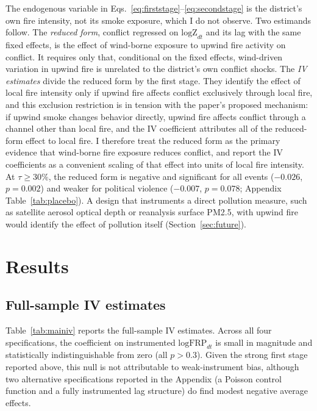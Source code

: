 \documentclass[12pt]{article}
\begin{document}
The endogenous variable in Eqs.~\eqref{eq:firststage}--\eqref{eq:secondstage} is the district's own fire intensity, not its smoke exposure, which I do not observe. Two estimands follow. The \emph{reduced form}, conflict regressed on $\text{logZ}_{dt}$ and its lag with the same fixed effects, is the effect of wind-borne exposure to upwind fire activity on conflict. It requires only that, conditional on the fixed effects, wind-driven variation in upwind fire is unrelated to the district's own conflict shocks. The \emph{IV estimates} divide the reduced form by the first stage. They identify the effect of local fire intensity only if upwind fire affects conflict exclusively through local fire, and this exclusion restriction is in tension with the paper's proposed mechanism: if upwind smoke changes behavior directly, upwind fire affects conflict through a channel other than local fire, and the IV coefficient attributes all of the reduced-form effect to local fire. I therefore treat the reduced form as the primary evidence that wind-borne fire exposure reduces conflict, and report the IV coefficients as a convenient scaling of that effect into units of local fire intensity. At $\tau \geq 30\%$, the reduced form is negative and significant for all events ($-0.026$, $p=0.002$) and weaker for political violence ($-0.007$, $p=0.078$; Appendix Table~\ref{tab:placebo}). A design that instruments a direct pollution measure, such as satellite aerosol optical depth or reanalysis surface PM2.5, with upwind fire would identify the effect of pollution itself (Section~\ref{sec:future}).

\section{Results}
\label{sec:results}

\subsection{Full-sample IV estimates}

Table~\ref{tab:mainiv} reports the full-sample IV estimates. Across all four specifications, the coefficient on instrumented $\text{logFRP}_{dt}$ is small in magnitude and statistically indistinguishable from zero (all $p>0.3$). Given the strong first stage reported above, this null is not attributable to weak-instrument bias, although two alternative specifications reported in the Appendix (a Poisson control function and a fully instrumented lag structure) do find modest negative average effects.
\end{document}
